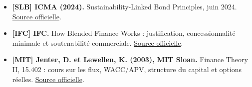 \documentclass[12pt,a4paper]{article}
\begin{document}
\begin{itemize}
\item \textbf{[SLB] ICMA (2024).} Sustainability-Linked Bond Principles, juin 2024. \href{https://www.icmagroup.org/assets/documents/Sustainable-finance/2024-updates/Sustainability-Linked-Bond-Principles-June-2024.pdf}{Source officielle}.
\item \textbf{[IFC] IFC.} How Blended Finance Works : justification, concessionnalité minimale et soutenabilité commerciale. \href{https://www.ifc.org/en/what-we-do/sector-expertise/blended-finance/how-blended-finance-works}{Source officielle}.
\item \textbf{[MIT] Jenter, D. et Lewellen, K. (2003), MIT Sloan.} Finance Theory II, 15.402 : cours sur les flux, WACC/APV, structure du capital et options réelles. \href{https://ocw.mit.edu/courses/15-402-finance-theory-ii-spring-2003/pages/lecture-notes/}{Source officielle}.
\end{itemize}\normalsize
\end{document}
